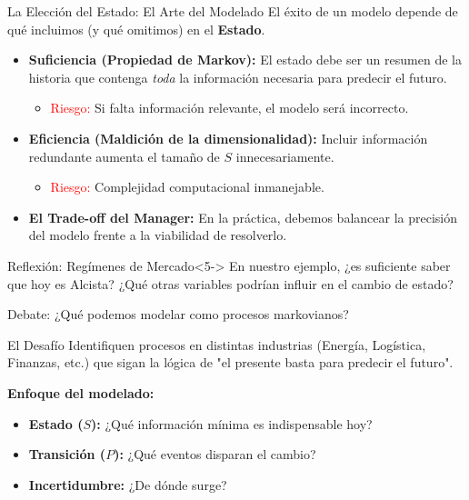 \documentclass[xcolor=dvipsnames]{beamer}
\begin{document}
\begin{frame}{La Elección del Estado: El Arte del Modelado}
El éxito de un modelo depende de qué incluimos (y qué omitimos) en el \textbf{Estado}.

\begin{itemize}
    \item<2-> \textbf{Suficiencia (Propiedad de Markov):}
    El estado debe ser un resumen de la historia que contenga \textit{toda} la información necesaria para predecir el futuro.
    \begin{itemize}
        \item \textcolor{red}{Riesgo:} Si falta información relevante, el modelo será incorrecto.
    \end{itemize}

    \item<3-> \textbf{Eficiencia (Maldición de la dimensionalidad):}
    Incluir información redundante aumenta el tamaño de $S$ innecesariamente.
    \begin{itemize}
        \item \textcolor{red}{Riesgo:} Complejidad computacional inmanejable.
    \end{itemize}

    \item<4-> \textbf{El Trade-off del Manager:}
    En la práctica, debemos balancear la precisión del modelo frente a la viabilidad de resolverlo.
\end{itemize}

\vspace{0.3cm}
\begin{exampleblock}{Reflexión: Regímenes de Mercado}<5->
En nuestro ejemplo, ¿es suficiente saber que hoy es Alcista? ¿Qué otras variables podr\'ian  influir en el cambio de estado?
\end{exampleblock}
\end{frame}

\begin{frame}{Debate: ¿Qué podemos modelar como procesos markovianos?}
\begin{block}{El Desafío}
Identifiquen procesos en distintas industrias (Energía, Logística, Finanzas, etc.) que sigan la lógica de "{}el presente basta para predecir el futuro".
\end{block}

\vspace{0.6cm}
\textbf{Enfoque del modelado:}
\begin{itemize}
    \item \textbf{Estado ($S$):} ¿Qué información mínima es indispensable hoy?
    \item \textbf{Transición ($P$):} ¿Qué eventos disparan el cambio?
    \item \textbf{Incertidumbre:} ¿De d\'onde surge?
\end{itemize}

\end{frame}
\end{document}
